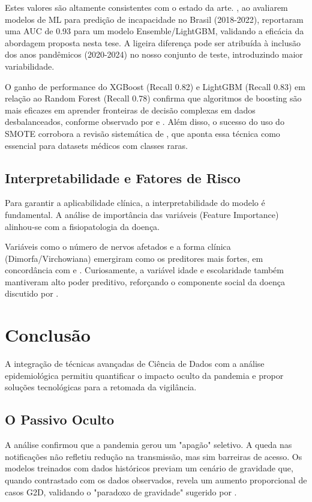 \documentclass[12pt, a4paper]{report}
\begin{document}
Estes valores são altamente consistentes com o estado da arte. \cite{freitas2025evaluating}, ao avaliarem modelos de ML para predição de incapacidade no Brasil (2018-2022), reportaram uma AUC de 0.93 para um modelo Ensemble/LightGBM, validando a eficácia da abordagem proposta nesta tese. A ligeira diferença pode ser atribuída à inclusão dos anos pandêmicos (2020-2024) no nosso conjunto de teste, introduzindo maior variabilidade.

O ganho de performance do XGBoost (Recall 0.82) e LightGBM (Recall 0.83) em relação ao Random Forest (Recall 0.78) confirma que algoritmos de boosting são mais eficazes em aprender fronteiras de decisão complexas em dados desbalanceados, conforme observado por \cite{indah2025comparison} e \cite{sezen2024comparative}. Além disso, o sucesso do uso do SMOTE corrobora a revisão sistemática de \cite{hairani2024addressing}, que aponta essa técnica como essencial para datasets médicos com classes raras.

\section{Interpretabilidade e Fatores de Risco}
Para garantir a aplicabilidade clínica, a interpretabilidade do modelo é fundamental. A análise de importância das variáveis (Feature Importance) alinhou-se com a fisiopatologia da doença.

\textbf{}

Variáveis como o número de nervos afetados e a forma clínica (Dimorfa/Virchowiana) emergiram como os preditores mais fortes, em concordância com \cite{matos2025time} e \cite{simoes2025development}. Curiosamente, a variável idade e escolaridade também mantiveram alto poder preditivo, reforçando o componente social da doença discutido por \cite{rocha2024impact}.

\chapter{Conclusão}

A integração de técnicas avançadas de Ciência de Dados com a análise epidemiológica permitiu quantificar o impacto oculto da pandemia e propor soluções tecnológicas para a retomada da vigilância.

\section{O Passivo Oculto}
A análise confirmou que a pandemia gerou um "apagão" seletivo. A queda nas notificações não refletiu redução na transmissão, mas sim barreiras de acesso. Os modelos treinados com dados históricos previam um cenário de gravidade que, quando contrastado com os dados observados, revela um aumento proporcional de casos G2D, validando o "paradoxo de gravidade" sugerido por \cite{deps2022backlog}.
\end{document}

